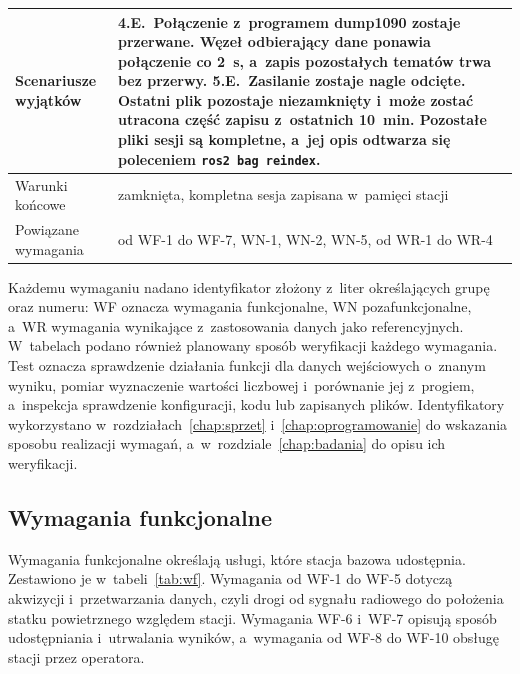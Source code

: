 \begin{table}[!htb]
\begin{tabular}{>{\raggedright}p{3.0cm} >{\raggedright\arraybackslash}p{12.1cm}}
    \midrule
    Scenariusze wyjątków &
    4.E.~Połączenie z~programem dump1090 zostaje przerwane. Węzeł odbierający dane ponawia połączenie co \SI{2}{s}, a~zapis pozostałych tematów trwa bez przerwy.\newline
    5.E.~Zasilanie zostaje nagle odcięte. Ostatni plik pozostaje niezamknięty i~może zostać utracona część zapisu z~ostatnich \SI{10}{min}. Pozostałe pliki sesji są kompletne, a~jej opis odtwarza się poleceniem \texttt{ros2 bag reindex}. \\
    \midrule
    Warunki końcowe & zamknięta, kompletna sesja zapisana w~pamięci stacji \\
    \midrule
    Powiązane wymagania & od WF-1 do WF-7, WN-1, WN-2, WN-5, od WR-1 do WR-4 \\
    \bottomrule
  \end{tabular}
\end{table}

Każdemu wymaganiu nadano identyfikator złożony z~liter określających grupę oraz numeru: WF oznacza wymagania funkcjonalne, WN pozafunkcjonalne, a~WR wymagania wynikające z~zastosowania danych jako referencyjnych. W~tabelach podano również planowany sposób weryfikacji każdego wymagania. Test oznacza sprawdzenie działania funkcji dla danych wejściowych o~znanym wyniku, pomiar wyznaczenie wartości liczbowej i~porównanie jej z~progiem, a~inspekcja sprawdzenie konfiguracji, kodu lub zapisanych plików. Identyfikatory wykorzystano w~rozdziałach~\ref{chap:sprzet} i~\ref{chap:oprogramowanie} do wskazania sposobu realizacji wymagań, a~w~rozdziale~\ref{chap:badania} do opisu ich weryfikacji.

\subsection{Wymagania funkcjonalne}
\label{sec:wymagania_funkcjonalne}

Wymagania funkcjonalne określają usługi, które stacja bazowa udostępnia. Zestawiono je w~tabeli~\ref{tab:wf}. Wymagania od WF-1 do WF-5 dotyczą akwizycji i~przetwarzania danych, czyli drogi od sygnału radiowego do położenia statku powietrznego względem stacji. Wymagania WF-6 i~WF-7 opisują sposób udostępniania i~utrwalania wyników, a~wymagania od WF-8 do WF-10 obsługę stacji przez operatora.

